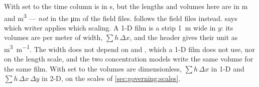 With  set to  the time column is in
\si{\second}, but the lengths and volumes here are in \si{\metre} and
\si{\metre\cubed} --- \emph{not} in the \si{\micro\metre} of the field files.
 follows the field files instead.  says which
writer applies which scaling. A 1-D film is a strip \SI{1}{\metre} wide in $y$:
its volumes are per meter of width, $\sum h\,\Delta x$, and the header gives
their unit as \si{\metre\cubed\per\metre}. The width does not depend on
 and , which a 1-D film does not use, nor on the
length scale, and the two concentration models write the same volume for the
same film. With  set to  the volumes are
dimensionless, $\sum h\,\Delta x$ in 1-D and $\sum h\,\Delta x\,\Delta y$ in 2-D,
on the scales of \cref{sec:governing:scales}.

